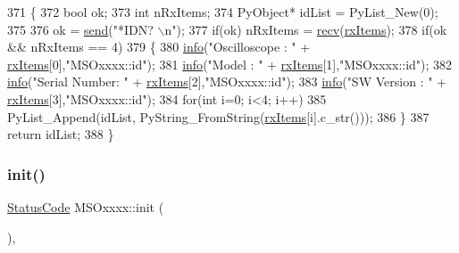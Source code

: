 \begin{DoxyCode}
371 \{   
372     \textcolor{keywordtype}{bool} ok;
373     \textcolor{keywordtype}{int} nRxItems;
374     PyObject* idList = PyList\_New(0);
375     
376     ok = \hyperlink{classMSOxxxx_ae77668a1ae4ccb74e0ed5f2485dfdebf}{send}(\textcolor{stringliteral}{"*IDN? \(\backslash\)n"});
377     \textcolor{keywordflow}{if}(ok)  nRxItems = \hyperlink{classMSOxxxx_aa02e46a61e287ef1f5377e9e42399faf}{recv}(\hyperlink{classMSOxxxx_a847cae37181e9ec5f481edcc3fb19b1a}{rxItems});
378     \textcolor{keywordflow}{if}(ok && nRxItems == 4)
379     \{
380         \hyperlink{classObject_a644fd329ea4cb85f54fa6846484b84a8}{info}(\textcolor{stringliteral}{"Oscilloscope : "} + \hyperlink{classMSOxxxx_a847cae37181e9ec5f481edcc3fb19b1a}{rxItems}[0],\textcolor{stringliteral}{"MSOxxxx::id"});
381         \hyperlink{classObject_a644fd329ea4cb85f54fa6846484b84a8}{info}(\textcolor{stringliteral}{"Model        : "} + \hyperlink{classMSOxxxx_a847cae37181e9ec5f481edcc3fb19b1a}{rxItems}[1],\textcolor{stringliteral}{"MSOxxxx::id"});
382         \hyperlink{classObject_a644fd329ea4cb85f54fa6846484b84a8}{info}(\textcolor{stringliteral}{"Serial Number: "} + \hyperlink{classMSOxxxx_a847cae37181e9ec5f481edcc3fb19b1a}{rxItems}[2],\textcolor{stringliteral}{"MSOxxxx::id"});
383         \hyperlink{classObject_a644fd329ea4cb85f54fa6846484b84a8}{info}(\textcolor{stringliteral}{"SW Version   : "} + \hyperlink{classMSOxxxx_a847cae37181e9ec5f481edcc3fb19b1a}{rxItems}[3],\textcolor{stringliteral}{"MSOxxxx::id"});
384         \textcolor{keywordflow}{for}(\textcolor{keywordtype}{int} i=0; i<4; i++)
385             PyList\_Append(idList, PyString\_FromString(\hyperlink{classMSOxxxx_a847cae37181e9ec5f481edcc3fb19b1a}{rxItems}[i].c\_str()));
386     \}
387     \textcolor{keywordflow}{return} idList;
388 \}
\end{DoxyCode}
\mbox{\label{classMSOxxxx_ac14ed16b221798423e7c3b5e285006b5}} 
\subsubsection{\texorpdfstring{init()}{init()}}
{\footnotesize\ttfamily \hyperlink{classStatusCode}{Status\+Code} M\+S\+Oxxxx\+::init (\begin{DoxyParamCaption}{ }\end{DoxyParamCaption})\hspace{0.3cm}{\ttfamily [inline]}, {\ttfamily [virtual]}}

